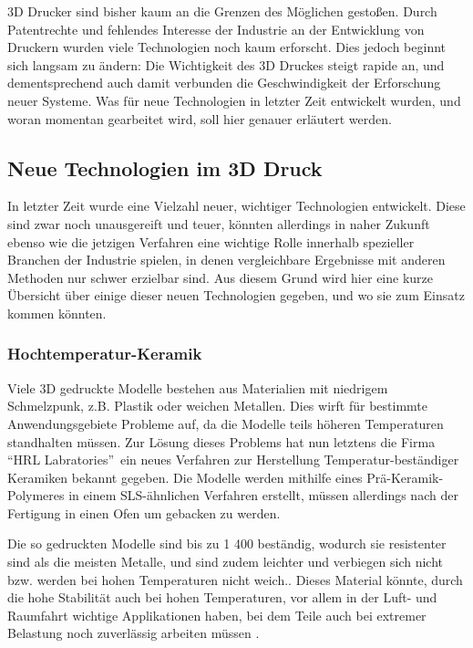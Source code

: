 3D Drucker sind bisher kaum an die Grenzen des Möglichen gestoßen. Durch Patentrechte und fehlendes Interesse der Industrie an der Entwicklung von Druckern wurden viele Technologien noch kaum erforscht. Dies jedoch beginnt sich langsam zu ändern: Die Wichtigkeit des 3D Druckes steigt rapide an, und dementsprechend auch damit verbunden die Geschwindigkeit der Erforschung neuer Systeme. Was für neue Technologien in letzter Zeit entwickelt wurden, und woran momentan gearbeitet wird, soll hier genauer erläutert werden.

\subsection{Neue Technologien im 3D Druck}
In letzter Zeit wurde eine Vielzahl neuer, wichtiger Technologien entwickelt. Diese sind zwar noch unausgereift und teuer, könnten allerdings in naher Zukunft ebenso wie die jetzigen Verfahren eine wichtige Rolle innerhalb spezieller Branchen der Industrie spielen, in denen vergleichbare Ergebnisse mit anderen Methoden nur schwer erzielbar sind. Aus diesem Grund wird hier eine kurze Übersicht über einige dieser neuen Technologien gegeben, und wo sie zum Einsatz kommen könnten.

\subsubsection{Hochtemperatur-Keramik}
Viele 3D gedruckte Modelle bestehen aus Materialien mit niedrigem Schmelzpunk, z.B. Plastik oder weichen Metallen. Dies wirft für bestimmte Anwendungsgebiete Probleme auf, da die Modelle teils höheren Temperaturen standhalten müssen. Zur Lösung dieses Problems hat nun letztens die Firma \textquotedblleft HRL Labratories\textquotedblright ~ein neues Verfahren zur Herstellung Temperatur-beständiger Keramiken bekannt gegeben. Die Modelle werden mithilfe eines Prä-Keramik-Polymeres in einem SLS-ähnlichen Verfahren erstellt, müssen allerdings nach der Fertigung in einen Ofen um gebacken zu werden.

Die so gedruckten Modelle sind bis zu 1 400 \TEMP beständig, wodurch sie resistenter sind als die meisten Metalle, und sind zudem leichter und verbiegen sich nicht bzw. werden bei hohen Temperaturen nicht weich.. 
Dieses Material könnte, durch die hohe Stabilität auch bei hohen Temperaturen, vor allem in der Luft- und Raumfahrt wichtige Applikationen haben, bei dem Teile auch bei extremer Belastung noch zuverlässig arbeiten müssen \parencite{HiTempCeram}.

